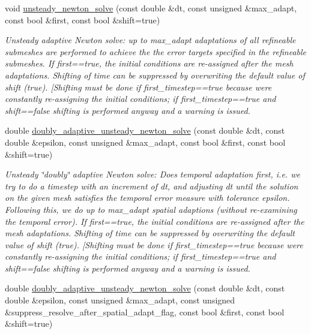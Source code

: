 \begin{DoxyCompactItemize}
void \hyperlink{classoomph_1_1Problem_af26bd71c24ba99c9391d6e932b68e5e8}{unsteady\+\_\+newton\+\_\+solve} (const double \&dt, const unsigned \&max\+\_\+adapt, const bool \&first, const bool \&shift=true)
\begin{DoxyCompactList}\small\item\em Unsteady adaptive Newton solve\+: up to max\+\_\+adapt adaptations of all refineable submeshes are performed to achieve the the error targets specified in the refineable submeshes. If first==true, the initial conditions are re-\/assigned after the mesh adaptations. Shifting of time can be suppressed by overwriting the default value of shift (true). \mbox{[}Shifting must be done if first\+\_\+timestep==true because we\textquotesingle{}re constantly re-\/assigning the initial conditions; if first\+\_\+timestep==true and shift==false shifting is performed anyway and a warning is issued. \end{DoxyCompactList}\item 
double \hyperlink{classoomph_1_1Problem_a7561d4f82e1fa625210c58a78294a301}{doubly\+\_\+adaptive\+\_\+unsteady\+\_\+newton\+\_\+solve} (const double \&dt, const double \&epsilon, const unsigned \&max\+\_\+adapt, const bool \&first, const bool \&shift=true)
\begin{DoxyCompactList}\small\item\em Unsteady \char`\"{}doubly\char`\"{} adaptive Newton solve\+: Does temporal adaptation first, i.\+e. we try to do a timestep with an increment of dt, and adjusting dt until the solution on the given mesh satisfies the temporal error measure with tolerance epsilon. Following this, we do up to max\+\_\+adapt spatial adaptions (without re-\/examining the temporal error). If first==true, the initial conditions are re-\/assigned after the mesh adaptations. Shifting of time can be suppressed by overwriting the default value of shift (true). \mbox{[}Shifting must be done if first\+\_\+timestep==true because we\textquotesingle{}re constantly re-\/assigning the initial conditions; if first\+\_\+timestep==true and shift==false shifting is performed anyway and a warning is issued. \end{DoxyCompactList}\item 
double \hyperlink{classoomph_1_1Problem_ae6c326bce8647c2a59cf62288ce4902e}{doubly\+\_\+adaptive\+\_\+unsteady\+\_\+newton\+\_\+solve} (const double \&dt, const double \&epsilon, const unsigned \&max\+\_\+adapt, const unsigned \&suppress\+\_\+resolve\+\_\+after\+\_\+spatial\+\_\+adapt\+\_\+flag, const bool \&first, const bool \&shift=true)

\end{DoxyCompactItemize}
